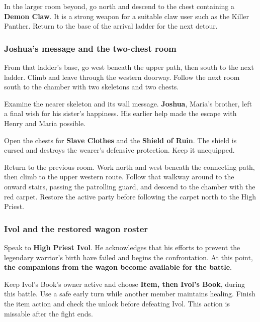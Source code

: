 In the larger room beyond, go north and descend to the
chest containing a \textbf{Demon Claw}. It is a strong
weapon for a suitable claw user such as the Killer Panther.
Return to the base of the arrival ladder for the next detour.

\subsubsection*{Joshua's message and the two-chest room}

From that ladder's base, go west beneath the upper path,
then south to the next ladder. Climb and leave through
the western doorway. Follow the next room south to the
chamber with two skeletons and two chests.

Examine the nearer skeleton and its wall message.
\textbf{Joshua}, Maria's brother, left a final wish for
his sister's happiness. His earlier help made the escape
with Henry and Maria possible.


Open the chests for \textbf{Slave Clothes} and the
\textbf{Shield of Ruin}. The shield is cursed and destroys
the wearer's defensive protection. Keep it unequipped.

Return to the previous room. Work north and west beneath
the connecting path, then climb to the upper western route.
Follow that walkway around to the onward stairs, passing
the patrolling guard, and descend to the chamber with the
red carpet. Restore the active party before following
the carpet north to the High Priest.

\subsubsection*{Ivol and the restored wagon roster}

Speak to \textbf{High Priest Ivol}. He acknowledges that
his efforts to prevent the legendary warrior's birth have
failed and begins the confrontation. At this point,
\textbf{the companions from the wagon become available
for the battle}.

Keep Ivol's Book's owner active and choose \textbf{Item, then Ivol's
Book}, during this battle. Use a safe early turn while another member
maintains healing. Finish the item action and check the unlock before
defeating Ivol. This action is missable after the fight ends.

